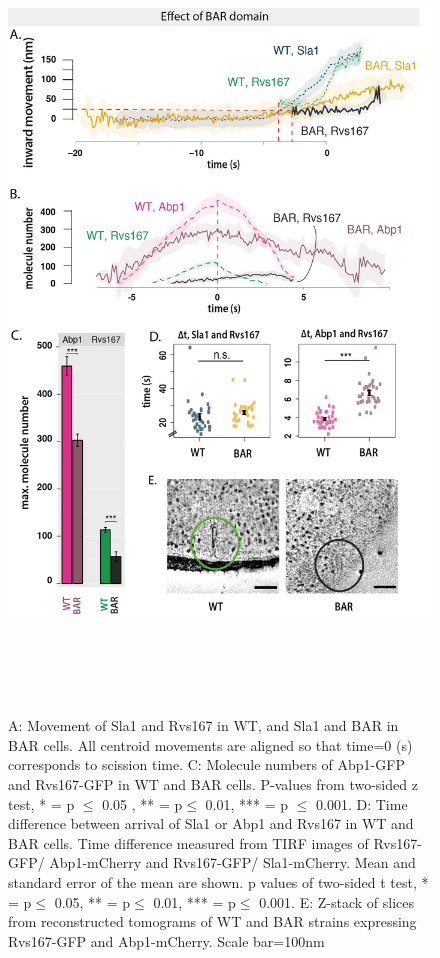 \begin{figure}[H]
	\centering
	\includegraphics[width=21cm,height=21cm,keepaspectratio]{figures/results_final/delsh3_8}
	\caption [Tracking endocytic proteins in BAR cells]
	{A: Movement of Sla1 and Rvs167 in WT, and Sla1 and BAR in BAR cells. All centroid movements are aligned so that time=0 (s) corresponds to scission time. 
		C: Molecule numbers of Abp1-GFP and Rvs167-GFP in WT and BAR cells. P-values from two-sided z test, * = p $\leq$ 0.05 , ** = p$\leq$ 0.01, *** = p $\leq$ 0.001. 
		D: Time difference between arrival of Sla1 or Abp1 and Rvs167  in WT and BAR cells. Time difference measured from TIRF images of  Rvs167-GFP/ Abp1-mCherry and Rvs167-GFP/ Sla1-mCherry. Mean and standard error of the mean are shown. p values of two-sided t test,  * = p$\leq$ 0.05, ** = p$\leq$ 0.01, *** = p$\leq$ 0.001. 
		E: Z-stack of slices from reconstructed tomograms of WT and BAR strains expressing Rvs167-GFP and Abp1-mCherry.  Scale bar=100nm
		\label{fig2_sh3del}}
	
\end{figure}
